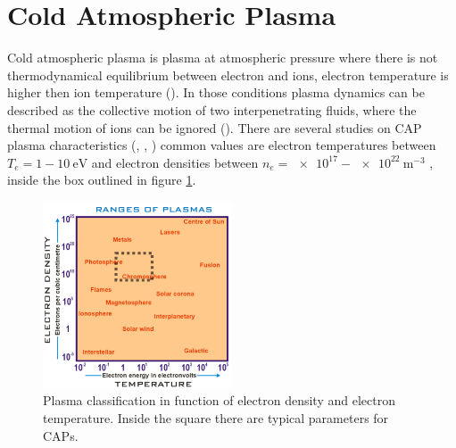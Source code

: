 \section{Cold Atmospheric Plasma}
Cold atmospheric plasma is plasma at atmospheric pressure where there is not thermodynamical equilibrium between electron and ions, electron temperature is higher then ion temperature (\cite{VONENGEL196599}). In those conditions plasma dynamics can be described as the collective motion of two interpenetrating fluids, where the thermal motion of ions can be ignored (\cite{goossens2012introduction}).
There are several studies on CAP plasma characteristics (\cite{Zhu_2009}, \cite{Ohyama_2009}, \cite{Amorim_2015}) common values are electron temperatures between $T_e = 1 - \SI{10}{\electronvolt}$ and electron densities between $n_e = \num{e17} - \SI{e22}{\meter^{-3}}$ , inside the box outlined in figure \ref{fig:plasmaclass}. 
\begin{figure}
 \centering
 \includegraphics[width=0.5\textwidth]{Images/Intro/Plasma_classification2.png}
 \caption{Plasma classification in function of electron density and electron temperature. Inside the square there are typical parameters for CAPs.}
 \label{fig:plasmaclass}
\end{figure}


